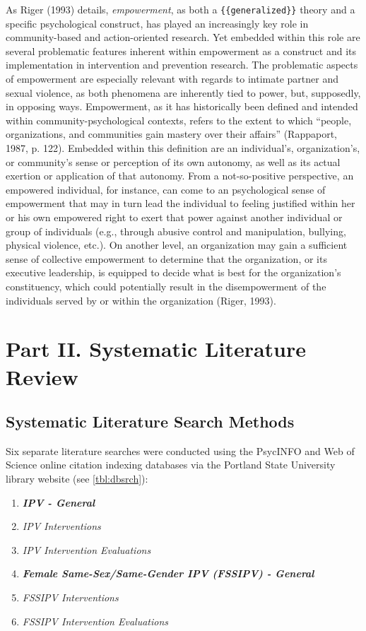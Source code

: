 \documentclass[11pt,]{tufte-book}
\providecommand{\tightlist}{%
  \setlength{\itemsep}{0pt}\setlength{\parskip}{0pt}}
\begin{document}
As Riger (1993) details, \emph{empowerment}, as both a
\texttt{\{\{generalized\}\}} theory and a specific psychological
construct, has played an increasingly key role in community-based and
action-oriented research. Yet embedded within this role are several
problematic features inherent within empowerment as a construct and its
implementation in intervention and prevention research. The problematic
aspects of empowerment are especially relevant with regards to intimate
partner and sexual violence, as both phenomena are inherently tied to
power, but, supposedly, in opposing ways. Empowerment, as it has
historically been defined and intended within community-psychological
contexts, refers to the extent to which ``people, organizations, and
communities gain mastery over their affairs'' (Rappaport, 1987, p. 122).
Embedded within this definition are an individual's, organization's, or
community's sense or perception of its own autonomy, as well as its
actual exertion or application of that autonomy. From a not-so-positive
perspective, an empowered individual, for instance, can come to an
psychological sense of empowerment that may in turn lead the individual
to feeling justified within her or his own empowered right to exert that
power against another individual or group of individuals (e.g., through
abusive control and manipulation, bullying, physical violence, etc.). On
another level, an organization may gain a sufficient sense of collective
empowerment to determine that the organization, or its executive
leadership, is equipped to decide what is best for the organization's
constituency, which could potentially result in the disempowerment of
the individuals served by or within the organization (Riger, 1993).

\part{Part II. Systematic Literature Review}

\chapter{Systematic Literature Search
Methods}\label{systematic-literature-search-methods}

Six separate literature searches were conducted using the PsycINFO and
Web of Science online citation indexing databases via the Portland State
University library website (see \cref{tbl:dbsrch}):

\begin{enumerate}
\def\labelenumi{\arabic{enumi}.}
\tightlist
\item
  \emph{\textbf{IPV - General}}
\item
  \emph{IPV Interventions}
\item
  \emph{IPV Intervention Evaluations}
\item
  \emph{\textbf{Female Same-Sex/Same-Gender IPV (FSSIPV) - General}}
\item
  \emph{FSSIPV Interventions}
\item
  \emph{FSSIPV Intervention Evaluations}
\end{enumerate}
\end{document}
